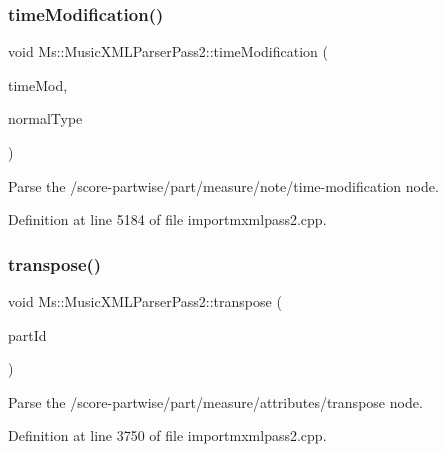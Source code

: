 \mbox{\label{class_ms_1_1_music_x_m_l_parser_pass2_a15374bf1fbe1441af87425e9394bbd3a}} 
\subsubsection{\texorpdfstring{time\+Modification()}{timeModification()}}
{\footnotesize\ttfamily void Ms\+::\+Music\+X\+M\+L\+Parser\+Pass2\+::time\+Modification (\begin{DoxyParamCaption}\item[{\hyperlink{class_ms_1_1_fraction}{Fraction} \&}]{time\+Mod,  }\item[{\hyperlink{class_ms_1_1_t_duration}{T\+Duration} \&}]{normal\+Type }\end{DoxyParamCaption})}

Parse the /score-\/partwise/part/measure/note/time-\/modification node. 

Definition at line 5184 of file importmxmlpass2.\+cpp.

\mbox{\label{class_ms_1_1_music_x_m_l_parser_pass2_a35d97342df1129c8a873332f2126fe23}} 
\subsubsection{\texorpdfstring{transpose()}{transpose()}}
{\footnotesize\ttfamily void Ms\+::\+Music\+X\+M\+L\+Parser\+Pass2\+::transpose (\begin{DoxyParamCaption}\item[{const Q\+String \&}]{part\+Id }\end{DoxyParamCaption})}

Parse the /score-\/partwise/part/measure/attributes/transpose node. 

Definition at line 3750 of file importmxmlpass2.\+cpp.

\mbox{\label{class_ms_1_1_music_x_m_l_parser_pass2_a1b43f9277d17fe4dfa909d711c4df21a}} 
